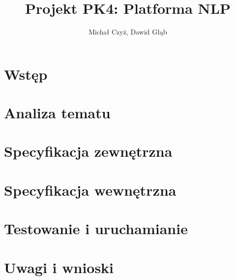 \documentclass{article}
\title{Projekt PK4: Platforma NLP}
\author{Michał Czyż, Dawid Głąb}
\begin{document}
\maketitle

\section{Wstęp}

\section{Analiza tematu}

\section{Specyfikacja zewnętrzna}

\section{Specyfikacja wewnętrzna}

\section{Testowanie i uruchamianie}

\section{Uwagi i wnioski}
\end{document}
